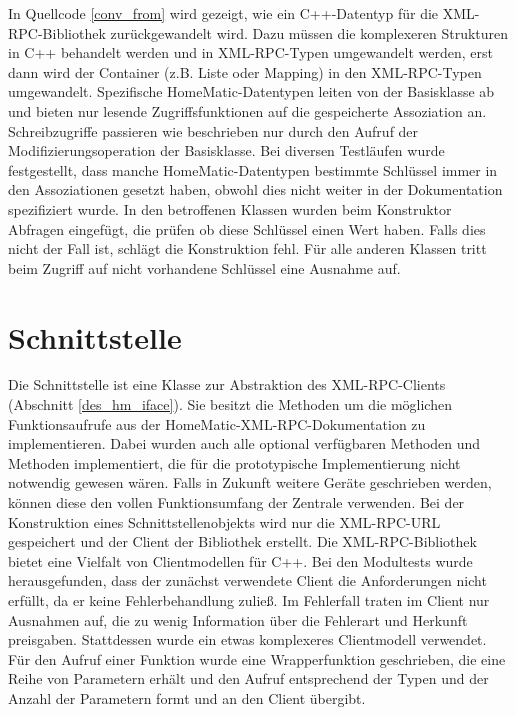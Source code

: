 In Quellcode \ref{conv_from} wird gezeigt, wie ein C++-Datentyp für die XML-RPC-Bibliothek zurückgewandelt wird.
Dazu müssen die komplexeren Strukturen in C++ behandelt werden und in XML-RPC-Typen umgewandelt werden, erst dann
wird der Container (z.B. Liste oder Mapping) in den XML-RPC-Typen umgewandelt.
Spezifische HomeMatic-Datentypen leiten von der Basisklasse ab und bieten nur lesende Zugriffsfunktionen auf die
gespeicherte Assoziation an.
Schreibzugriffe passieren wie beschrieben nur durch den Aufruf der Modifizierungsoperation der Basisklasse.
Bei diversen Testläufen wurde festgestellt, dass manche HomeMatic-Datentypen bestimmte Schlüssel immer
in den Assoziationen gesetzt haben, obwohl dies nicht weiter in der Dokumentation spezifiziert wurde.
In den betroffenen Klassen wurden beim Konstruktor Abfragen eingefügt, die prüfen ob diese Schlüssel einen Wert haben.
Falls dies nicht der Fall ist, schlägt die Konstruktion fehl.
Für alle anderen Klassen tritt beim Zugriff auf nicht vorhandene Schlüssel eine Ausnahme auf.

\section{Schnittstelle}
\label{imp_hm_iface}

Die Schnittstelle ist eine Klasse zur Abstraktion des XML-RPC-Clients (Abschnitt \ref{des_hm_iface}).
Sie besitzt die Methoden um die möglichen Funktionsaufrufe aus der HomeMatic-XML-RPC-Dokumentation \cite{homematic_xmlrpc}
zu implementieren.
Dabei wurden auch alle optional verfügbaren Methoden und Methoden implementiert, die für die prototypische
Implementierung nicht notwendig gewesen wären.
Falls in Zukunft weitere Geräte geschrieben werden, können diese den vollen Funktionsumfang der Zentrale verwenden.
Bei der Konstruktion eines Schnittstellenobjekts wird nur die XML-RPC-URL gespeichert und der Client der Bibliothek
erstellt.
Die XML-RPC-Bibliothek bietet eine Vielfalt von Clientmodellen für C++.
Bei den Modultests wurde herausgefunden, dass der zunächst verwendete Client die Anforderungen nicht erfüllt, da er keine
Fehlerbehandlung zuließ.
Im Fehlerfall traten im Client nur Ausnahmen auf, die zu wenig Information über die Fehlerart und Herkunft preisgaben.
Stattdessen wurde ein etwas komplexeres Clientmodell verwendet.
Für den Aufruf einer Funktion wurde eine Wrapperfunktion geschrieben, die eine Reihe von Parametern erhält und den Aufruf
entsprechend der Typen und der Anzahl der Parametern formt und an den Client übergibt.

